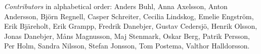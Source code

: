 \emph{Contributors} in alphabetical order:
Anders Buhl,
Anna Axelsson,
Anton Andersson,
Björn Regnell,
Casper Schreiter,
Cecilia Lindskog,
Emelie Engström,
Erik Bjäreholt,
Erik Grampp,
Fredrik Danebjer,
Gustav Cedersjö,
Henrik Olsson,
Jonas Danebjer, 
Måns Magnusson,
Maj Stenmark,
Oskar Berg,
Patrik Persson,
Per Holm,
Sandra Nilsson,
Stefan Jonsson,
Tom Postema,
Valthor Halldorsson. 
